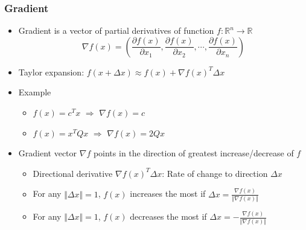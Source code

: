 \subsubsection*{Gradient}
\begin{itemize}
    \item Gradient is a vector of partial derivatives of function $f:\mathbb{R}^n\rightarrow\mathbb{R}$
    \begin{equation}
        \nabla f(x)=\left(\frac{\partial f(x)}{\partial x_1},\frac{\partial f(x)}{\partial x_2},\cdots,\frac{\partial f(x)}{\partial x_n}\right)
    \end{equation}
    \item Taylor expansion: $f(x + \Delta x) \approx f(x) + \nabla f(x)^T \Delta x$
    \item Example
    \begin{itemize}
        \item $f(x)=c^Tx$ $\Rightarrow$ $\nabla f(x)=c$
        \item $f(x)=x^TQx$ $\Rightarrow$ $\nabla f(x)=2Qx$
    \end{itemize}
    \item Gradient vector $\nabla f$ points in the direction of greatest increase/decrease of $f$
    \begin{itemize}
        \item Directional derivative $\nabla f(x)^T\Delta x$: Rate of change to direction $\Delta x$
        \item For any $\Vert\Delta x\Vert=1$, $f(x)$ increases the most if $\Delta x=\frac{\nabla f(x)}{\Vert\nabla f(x)\Vert}$
        \item For any $\Vert\Delta x\Vert=1$, $f(x)$ decreases the most if $\Delta x=-\frac{\nabla f(x)}{\Vert\nabla f(x)\Vert}$
    \end{itemize}
\end{itemize}

